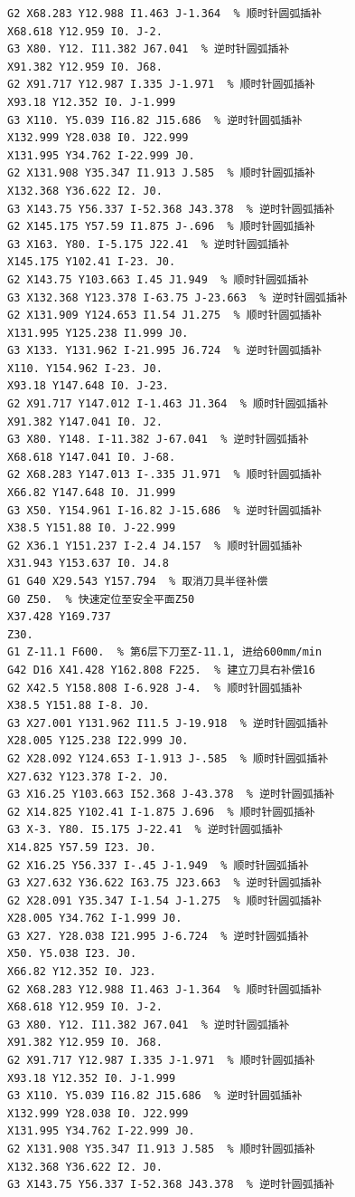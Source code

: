 \documentclass{xautCADreport}
\begin{document}
\begin{lstlisting}[language={}, title={工序50-凸模.nc（完整程序）}, basicstyle=\ttfamily\tiny]
G2 X68.283 Y12.988 I1.463 J-1.364  % 顺时针圆弧插补
X68.618 Y12.959 I0. J-2.
G3 X80. Y12. I11.382 J67.041  % 逆时针圆弧插补
X91.382 Y12.959 I0. J68.
G2 X91.717 Y12.987 I.335 J-1.971  % 顺时针圆弧插补
X93.18 Y12.352 I0. J-1.999
G3 X110. Y5.039 I16.82 J15.686  % 逆时针圆弧插补
X132.999 Y28.038 I0. J22.999
X131.995 Y34.762 I-22.999 J0.
G2 X131.908 Y35.347 I1.913 J.585  % 顺时针圆弧插补
X132.368 Y36.622 I2. J0.
G3 X143.75 Y56.337 I-52.368 J43.378  % 逆时针圆弧插补
G2 X145.175 Y57.59 I1.875 J-.696  % 顺时针圆弧插补
G3 X163. Y80. I-5.175 J22.41  % 逆时针圆弧插补
X145.175 Y102.41 I-23. J0.
G2 X143.75 Y103.663 I.45 J1.949  % 顺时针圆弧插补
G3 X132.368 Y123.378 I-63.75 J-23.663  % 逆时针圆弧插补
G2 X131.909 Y124.653 I1.54 J1.275  % 顺时针圆弧插补
X131.995 Y125.238 I1.999 J0.
G3 X133. Y131.962 I-21.995 J6.724  % 逆时针圆弧插补
X110. Y154.962 I-23. J0.
X93.18 Y147.648 I0. J-23.
G2 X91.717 Y147.012 I-1.463 J1.364  % 顺时针圆弧插补
X91.382 Y147.041 I0. J2.
G3 X80. Y148. I-11.382 J-67.041  % 逆时针圆弧插补
X68.618 Y147.041 I0. J-68.
G2 X68.283 Y147.013 I-.335 J1.971  % 顺时针圆弧插补
X66.82 Y147.648 I0. J1.999
G3 X50. Y154.961 I-16.82 J-15.686  % 逆时针圆弧插补
X38.5 Y151.88 I0. J-22.999
G2 X36.1 Y151.237 I-2.4 J4.157  % 顺时针圆弧插补
X31.943 Y153.637 I0. J4.8
G1 G40 X29.543 Y157.794  % 取消刀具半径补偿
G0 Z50.  % 快速定位至安全平面Z50
X37.428 Y169.737
Z30.
G1 Z-11.1 F600.  % 第6层下刀至Z-11.1, 进给600mm/min
G42 D16 X41.428 Y162.808 F225.  % 建立刀具右补偿16
G2 X42.5 Y158.808 I-6.928 J-4.  % 顺时针圆弧插补
X38.5 Y151.88 I-8. J0.
G3 X27.001 Y131.962 I11.5 J-19.918  % 逆时针圆弧插补
X28.005 Y125.238 I22.999 J0.
G2 X28.092 Y124.653 I-1.913 J-.585  % 顺时针圆弧插补
X27.632 Y123.378 I-2. J0.
G3 X16.25 Y103.663 I52.368 J-43.378  % 逆时针圆弧插补
G2 X14.825 Y102.41 I-1.875 J.696  % 顺时针圆弧插补
G3 X-3. Y80. I5.175 J-22.41  % 逆时针圆弧插补
X14.825 Y57.59 I23. J0.
G2 X16.25 Y56.337 I-.45 J-1.949  % 顺时针圆弧插补
G3 X27.632 Y36.622 I63.75 J23.663  % 逆时针圆弧插补
G2 X28.091 Y35.347 I-1.54 J-1.275  % 顺时针圆弧插补
X28.005 Y34.762 I-1.999 J0.
G3 X27. Y28.038 I21.995 J-6.724  % 逆时针圆弧插补
X50. Y5.038 I23. J0.
X66.82 Y12.352 I0. J23.
G2 X68.283 Y12.988 I1.463 J-1.364  % 顺时针圆弧插补
X68.618 Y12.959 I0. J-2.
G3 X80. Y12. I11.382 J67.041  % 逆时针圆弧插补
X91.382 Y12.959 I0. J68.
G2 X91.717 Y12.987 I.335 J-1.971  % 顺时针圆弧插补
X93.18 Y12.352 I0. J-1.999
G3 X110. Y5.039 I16.82 J15.686  % 逆时针圆弧插补
X132.999 Y28.038 I0. J22.999
X131.995 Y34.762 I-22.999 J0.
G2 X131.908 Y35.347 I1.913 J.585  % 顺时针圆弧插补
X132.368 Y36.622 I2. J0.
G3 X143.75 Y56.337 I-52.368 J43.378  % 逆时针圆弧插补

\end{lstlisting}
\end{document}
